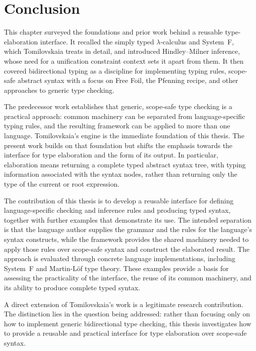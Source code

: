 \section{Conclusion}

This chapter surveyed the foundations and prior work behind a reusable type-elaboration interface. It recalled the simply typed $\lambda$-calculus and System~F, which Tomilovskaia treats in detail, and introduced Hindley--Milner inference, whose need for a unification constraint context sets it apart from them. It then covered bidirectional typing as a discipline for implementing typing rules, scope-safe abstract syntax with a focus on Free Foil, the Pfenning recipe, and other approaches to generic type checking.

The predecessor work establishes that generic, scope-safe type checking is a practical approach: common machinery can be separated from language-specific typing rules, and the resulting framework can be applied to more than one language. Tomilovskaia's engine is the immediate foundation of this thesis. The present work builds on that foundation but shifts the emphasis towards the interface for type elaboration and the form of its output. In particular, elaboration means returning a complete typed abstract syntax tree, with typing information associated with the syntax nodes, rather than returning only the type of the current or root expression.

The contribution of this thesis is to develop a reusable interface for defining language-specific checking and inference rules and producing typed syntax, together with further examples that demonstrate its use. The intended separation is that the language author supplies the grammar and the rules for the language's syntax constructs, while the framework provides the shared machinery needed to apply those rules over scope-safe syntax and construct the elaborated result. The approach is evaluated through concrete language implementations, including System~F and Martin-L\"of type theory. These examples provide a basis for assessing the practicality of the interface, the reuse of its common machinery, and its ability to produce complete typed syntax.

A direct extension of Tomilovskaia's work is a legitimate research contribution. The distinction lies in the question being addressed: rather than focusing only on how to implement generic bidirectional type checking, this thesis investigates how to provide a reusable and practical interface for type elaboration over scope-safe syntax.
